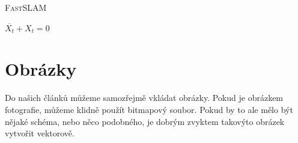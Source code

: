 \documentclass[11pt]{article}
\theoremstyle{plain}
\theoremstyle{plain}
\begin{document}
\SetAlgoNoLine
\begin{algorithm}
    \caption{\textsc{Fast}SLAM}
    $\overline{X_t} + X_t = 0$ \\
\end{algorithm}

\section{Obrázky}
Do našich článků můžeme samozřejmě vkládat obrázky. Pokud je obrázkem fotografie, můžeme klidně použít bitmapový soubor. Pokud by to ale mělo být nějaké schéma, nebo něco podobného, je dobrým zvyktem takovýto obrázek vytvořit vektorově.
\end{document}

